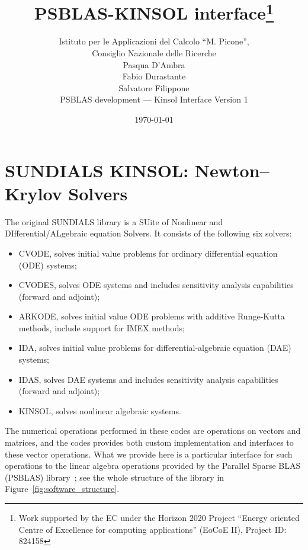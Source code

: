 \documentclass[twoside,a4paper]{refart}
\title{PSBLAS-KINSOL interface\thanks{Work supported by the EC under the Horizon 2020 Project ``Energy oriented Centre of Excellence for computing applications'' (EoCoE II), Project ID: 824158}}
\author{Istituto per le Applicazioni del Calcolo ``M. Picone'',\\
	Consiglio Nazionale delle Ricerche \\
	Pasqua D'Ambra \\
	Fabio Durastante \\
	Salvatore Filippone \\
	PSBLAS development --- Kinsol Interface Version 1}
\date{\today}
\theoremstyle{definition}
\begin{document}
	\maketitle
	
	\tableofcontents
	\newpage
	
	
	\section{SUNDIALS KINSOL: Newton--Krylov Solvers}
	
	The original SUNDIALS library is a SUite of Nonlinear and DIfferential/ALgebraic equation Solvers.  It consists of the following six solvers:
	\begin{itemize}
		\item CVODE, solves initial value problems for ordinary differential equation (ODE) systems;
		\item CVODES, solves ODE systems and includes sensitivity analysis capabilities (forward and adjoint);
		\item ARKODE, solves initial value ODE problems with additive Runge-Kutta methods, include support for IMEX methods;
		\item IDA, solves initial value problems for differential-algebraic equation (DAE) systems;
		\item IDAS, solves DAE systems and includes sensitivity analysis capabilities (forward and adjoint);
		\item KINSOL, solves nonlinear algebraic systems.
	\end{itemize}
	
	The numerical operations performed in these codes are operations on vectors and matrices, and the codes provides both custom implementation and interfaces to these vector operations. What we provide here is a particular interface for such operations to the linear algebra operations provided by the Parallel Sparse BLAS (PSBLAS) library~\cite{filippone2000psblas,filippone2012object}; see the whole structure of the library in Figure~\ref{fig:software_structure}.
\end{document}
